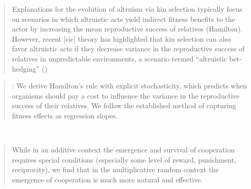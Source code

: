 \documentclass[a4paper,10pt]{article}
\begin{document}
\begin{quotation} \cite{capillaLasheras2021-betHedging}
    Explanations for the evolution of altruism via kin selection typically  focus on scenarios in which altruistic acts yield indirect fitness benefits to the actor by increasing the mean reproductive success of relatives (Hamilton).
    However, recent [sic] theory has highlighted that kin selection can also favor altruistic acts if they decrease variance in the reproductive success of relatives in unpredictable environments, a scenario termed “altruistic bet-hedging” (\cite{kennedy2018-betHedging})
\end{quotation}

\begin{quotation} \cite{kennedy2018-betHedging}:
    We derive Hamilton’s rule with explicit stochasticity, which predicts when organisms should pay a cost to influence the variance in the reproductive success of their relatives.
    We follow the established method of capturing fitness effects as regression slopes.
\end{quotation}

\\

\begin{quotation}  \cite{yaari2010-cooperationEvolution}
While in an additive context the emergence and survival of cooperation requires special conditions (especially some level of reward, punishment, reciprocity), we find that in the multiplicative random context the emergence of cooperation is much more natural and effective.
\end{quotation}


{\footnotesize


}
\end{document}
